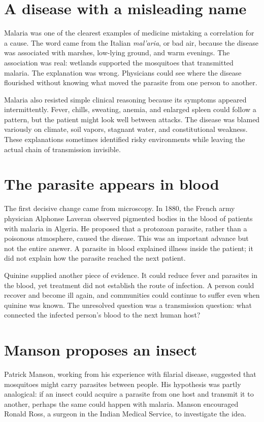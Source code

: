 \documentclass[12pt,oneside]{book}
\begin{document}
\section{A disease with a misleading name}
Malaria was one of the clearest examples of medicine mistaking a correlation for
a cause. The word came from the Italian \emph{mal'aria}, or bad air, because
the disease was associated with marshes, low-lying ground, and warm evenings.
The association was real: wetlands supported the mosquitoes that transmitted
malaria. The explanation was wrong. Physicians could see where the disease
flourished without knowing what moved the parasite from one person to another.

Malaria also resisted simple clinical reasoning because its symptoms appeared
intermittently. Fever, chills, sweating, anemia, and enlarged spleen could
follow a pattern, but the patient might look well between attacks. The disease
was blamed variously on climate, soil vapors, stagnant water, and constitutional
weakness. These explanations sometimes identified risky environments while
leaving the actual chain of transmission invisible.

\section{The parasite appears in blood}
The first decisive change came from microscopy. In 1880, the French army
physician Alphonse Laveran observed pigmented bodies in the blood of patients
with malaria in Algeria. He proposed that a protozoan parasite, rather than a
poisonous atmosphere, caused the disease. This was an important advance but not
the entire answer. A parasite in blood explained illness inside the patient;
it did not explain how the parasite reached the next patient.

Quinine supplied another piece of evidence. It could reduce fever and parasites
in the blood, yet treatment did not establish the route of infection. A person
could recover and become ill again, and communities could continue to suffer
even when quinine was known. The unresolved question was a transmission
question: what connected the infected person's blood to the next human host?

\section{Manson proposes an insect}
Patrick Manson, working from his experience with filarial disease, suggested
that mosquitoes might carry parasites between people. His hypothesis was partly
analogical: if an insect could acquire a parasite from one host and transmit it
to another, perhaps the same could happen with malaria. Manson encouraged Ronald
Ross, a surgeon in the Indian Medical Service, to investigate the idea.
\end{document}
